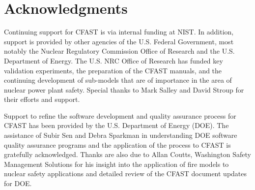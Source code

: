\documentclass[12pt]{book}
\begin{document}
\chapter{Acknowledgments}

\label{acksection}

Continuing support for CFAST is via internal funding at NIST. In addition, support is provided by other agencies of the U.S. Federal Government, most notably the Nuclear Regulatory Commission Office of Research and the U.S. Department of Energy. The U.S. NRC Office of Research has funded key validation experiments, the preparation of the CFAST manuals, and the continuing development of sub-models that are of importance in the area of nuclear power plant safety. Special thanks to Mark Salley and David Stroup for their efforts and support. 

Support to refine the software development and quality assurance process for CFAST has been provided by the U.S. Department of Energy (DOE). The assistance of Subir Sen and Debra Sparkman in understanding DOE software quality assurance programs and the application of the process to CFAST is gratefully acknowledged. Thanks are also due to Allan Coutts, Washington Safety Management Solutions for his insight into the application of fire models to nuclear safety applications and detailed review of the CFAST document updates for DOE.

\tableofcontents

\listoffigures

\listoftables

\mainmatter












\appendix
{}


\end{document}
